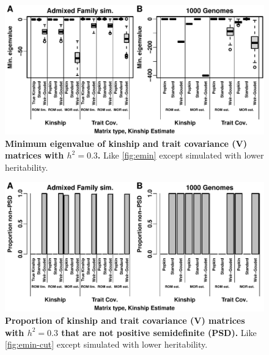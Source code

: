 \documentclass[11pt]{article}
\begin{document}
\begin{figure}[bp!]
  \centering
  \includegraphics[width=\textwidth]{h-0.3/emin.pdf}
  \caption{
    {\bf Minimum eigenvalue of kinship and trait covariance ($\mathbf{V}$) matrices with $h^2=0.3$.}
    Like \cref{fig:emin} except simulated with lower heritability.
  }
  \label{fig:emin-h3}
\end{figure}

\begin{figure}[bp!]
  \centering
  \includegraphics[width=\textwidth]{h-0.3/emin-cut.pdf}
  \caption{
    {\bf Proportion of kinship and trait covariance ($\mathbf{V}$) matrices with $h^2=0.3$ that are not positive semidefinite (PSD).}
    Like \cref{fig:emin-cut} except simulated with lower heritability.
  }
  \label{fig:emin-cut-h3}
\end{figure}
\end{document}
